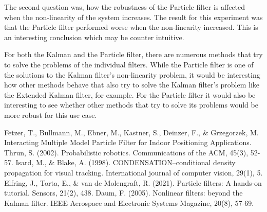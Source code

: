 \documentclass[conference]{IEEEtran}
\begin{document}
The second question was, how the robustness of the Particle filter is affected when the non-linearity of the system increases.
The result for this experiment was that the Particle filter performed worse when the non-linearity increased. 
This is an interesting conclusion which may be counter intuitive.

For both the Kalman and the Particle filter, there are numerous methods that try to solve the problems of the individual filters. 
While the Particle filter is one of the solutions to the Kalman filter's non-linearity problem, it would be interesting how other methods behave that also try to solve the Kalman filter's problem like the Extended Kalman filter, for example.
For the Particle filter it would also be interesting to see whether other methods that try to solve its problems would be more robust for this use case.


\begin{thebibliography}{00} %
	 Fetzer, T., Bullmann, M., Ebner, M., Kastner, S., Deinzer, F., \& Grzegorzek, M. Interacting Multiple Model Particle Filter for Indoor Positioning Applications.
	 Thrun, S. (2002). Probabilistic robotics. Communications of the ACM, 45(3), 52-57. %
	 Isard, M., \& Blake, A. (1998). CONDENSATION--conditional density propagation for visual tracking. International journal of computer vision, 29(1), 5.
	 Elfring, J., Torta, E., \& van de Molengraft, R. (2021). Particle filters: A hands-on tutorial. Sensors, 21(2), 438.
	 Daum, F. (2005). Nonlinear filters: beyond the Kalman filter. IEEE Aerospace and Electronic Systems Magazine, 20(8), 57-69.

\end{thebibliography}
\end{document}
